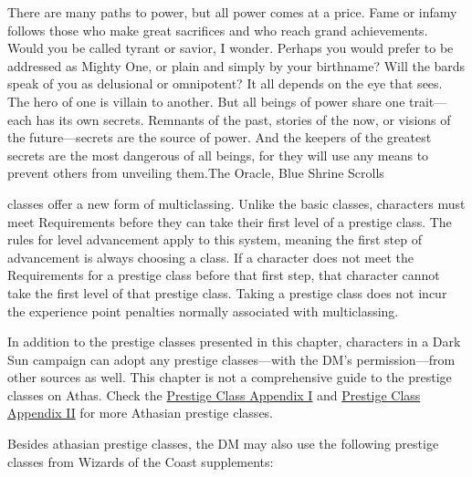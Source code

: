 {There are many paths to power, but all power comes at a price. Fame or infamy follows those who make great sacrifices and who reach grand achievements. Would you be called tyrant or savior, I wonder. Perhaps you would prefer to be addressed as Mighty One, or plain and simply by your birthname? Will the bards speak of you as delusional or omnipotent? It all depends on the eye that sees. The hero of one is villain to another. But all beings of power share one trait---each has its own secrets. Remnants of the past, stories of the now, or visions of the future---secrets are the source of power. And the keepers of the greatest secrets are the most dangerous of all beings, for they will use any means to prevent others from unveiling them.}{The Oracle, Blue Shrine Scrolls}

 classes offer a new form of multiclassing. Unlike the basic classes, characters must meet Requirements before they can take their first level of a prestige class. The rules for level advancement apply to this system, meaning the first step of advancement is always choosing a class. If a character does not meet the Requirements for a prestige class before that first step, that character cannot take the first level of that prestige class. Taking a prestige class does not incur the experience point penalties normally associated with multiclassing.


In addition to the prestige classes presented in this chapter, characters in a {\tableheader Dark Sun} campaign can adopt any prestige classes---with the DM's permission---from other sources as well. This chapter is not a comprehensive guide to the prestige classes on Athas. Check the \href{http://athas.org/products/prc1}{Prestige Class Appendix I} and \href{http://athas.org/products/prc2}{Prestige Class Appendix II} for more Athasian prestige classes.

Besides athasian prestige classes, the DM may also use the following prestige classes from Wizards of the Coast supplements:


